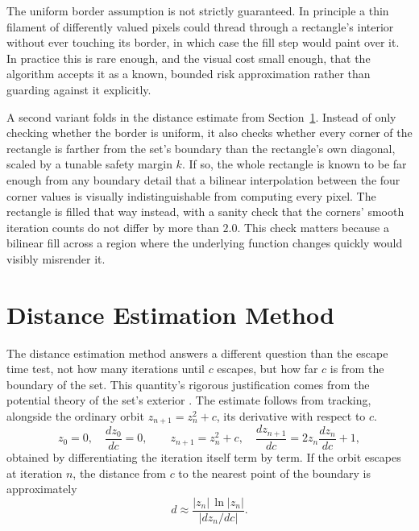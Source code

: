 \documentclass{ftndiplomski}
\begin{document}
The uniform border assumption is not strictly guaranteed. In principle a thin filament of
differently valued pixels could thread through a rectangle's interior without ever touching its
border, in which case the fill step would paint over it. In practice this is rare enough, and the
visual cost small enough, that the algorithm accepts it as a known, bounded risk approximation
rather than guarding against it explicitly.

A second variant folds in the distance estimate from Section~\ref{sec:dem}. Instead of only
checking whether the border is uniform, it also checks whether every corner of the rectangle is
farther from the set's boundary than the rectangle's own diagonal, scaled by a tunable safety
margin $k$. If so, the whole rectangle is known to be far enough from any boundary detail that a
bilinear interpolation between the four corner values is visually indistinguishable from computing
every pixel. The rectangle is filled that way instead, with a sanity check that the corners'
smooth iteration counts do not differ by more than $2.0$. This check matters because a bilinear
fill across a region where the underlying function changes quickly would visibly misrender it.

\section{Distance Estimation Method}
\label{sec:dem}

The distance estimation method \cite{peitgensaupe1988} answers a different question than the
escape time test, not how many iterations until $c$ escapes, but how far $c$ is from the boundary
of the set. This quantity's rigorous justification comes from the potential theory of the set's
exterior \cite{milnor2006}. The estimate follows from tracking, alongside the ordinary orbit
$z_{n+1} = z_n^2 + c$, its derivative with respect to $c$.
\begin{equation}
  \label{eq:dem-derivative}
  z_0 = 0, \quad \frac{dz_0}{dc} = 0, \qquad
  z_{n+1} = z_n^2 + c, \quad \frac{dz_{n+1}}{dc} = 2 z_n \frac{dz_n}{dc} + 1,
\end{equation}
obtained by differentiating the iteration itself term by term. If the orbit escapes at iteration
$n$, the distance from $c$ to the nearest point of the boundary is approximately
\begin{equation}
  \label{eq:dem-distance}
  d \approx \frac{|z_n| \, \ln |z_n|}{|dz_n/dc|} .
\end{equation}
\end{document}
